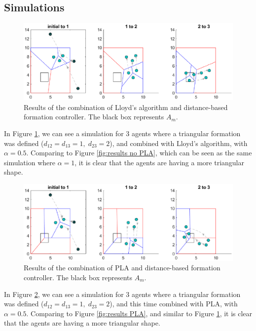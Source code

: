 \documentclass{iacas}
\begin{document}
\subsection{Simulations}

\begin{figure}[H]
\includegraphics[scale=0.8]{figures/proposed-sol/results/sim3-3agents-3partitions-noPLA-formation.eps}
\caption{Results of the combination of Lloyd's algorithm and distance-based formation controller. The black box represents $A_m$.}
\label{fig:results formation, no PLA}
\end{figure}

In Figure \ref{fig:results formation, no PLA}, we can see a simulation for 3 agents where a triangular formation was defined ($d_{12} = d_{13} = 1,\; d_{23} = 2$), and combined with Lloyd's algorithm, with $\alpha = 0.5$. Comparing to Figure \ref{fig:results no PLA}, which can be seen as the same simulation where $\alpha = 1$, it is clear that the agents are having a more triangular shape.

\begin{figure}[H]
\includegraphics[scale=0.8]{figures/proposed-sol/results/sim4-3agents-3partitions-PLA-formation.eps}
\caption{Results of the combination of PLA and distance-based formation controller. The black box represents $A_m$.}
\label{fig:results formation, PLA}
\end{figure}

In Figure \ref{fig:results formation, PLA}, we can see a simulation for 3 agents where a triangular formation was defined ($d_{12} = d_{13} = 1,\; d_{23} = 2$), and this time combined with PLA, with $\alpha = 0.5$. Comparing to Figure \ref{fig:results PLA}, and similar to Figure \ref{fig:results formation, no PLA}, it is clear that the agents are having a more triangular shape.
\end{document}
